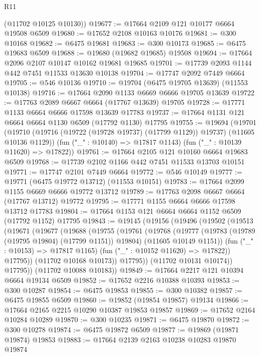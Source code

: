 \begin{lexlean}{R11}
\begin{coremodule}
{{{{{{{{{{{{{{{{{{{{{{{{{{{{{{{{{{{{{{{{{{{{{{{{{{{{{{{{{{{{{{{{{{{{{{{{{{{{{{{{{{      (@11702 @10125 @10130))
@19677 := @17664 @2109 @121 @10177 @6664 @19508 @6509
@19680 := @17652 @2108 @10163 @10176
@19681 := @300 @10168
@19682 := @6475 @19681
@19683 := @300 @10173
@19685 := @6475 @19683 @6509
@19688 := @19680 (@19682 @19685) @19508
@19694 := @17664 @2096 @2107 @10147 @10162 @19681 @19685
@19701 := @17739 @2093 @1144 @442 @7451 @11533 @13630 @10138
@19704 := @17747 @2092 @7449 @6664
@19705 := @546 @10136
@19710 := @19704 (@6475 @19705 @13639) (@11553 @10138)
@19716 := @17664 @2090 @1133 @6669 @6666 @19705 @13639
@19722 := @17763 @2089 @6667 @6664 (@17767 @13639) @19705
@19728 := @17771 @1133 @6664 @6666 @17598 @13639 @17783
@19737 := @17664 @1131 @121 @6664 @6664 @1130 @6509 (@17792 @1130) @17795
@19755 := @19694
    (@19701
      (@19710 (@19716 (@19722 (@19728 @19737) (@17799 @1129)) @19737) (@11605 @10136 @1129))
      (fun ("_" : @10140) => @17817 @1143)
      (fun ("_" : @10139 @11620) => @17822))
@19761 := @17664 @2105 @121 @10160 @6664 @19683 @6509
@19768 := @17739 @2102 @1166 @442 @7451 @11533 @13703 @10151
@19771 := @17747 @2101 @7449 @6664
@19772 := @546 @10149
@19777 := @19771 (@6475 @19772 @13712) (@11553 @10151)
@19783 := @17664 @2099 @1155 @6669 @6666 @19772 @13712
@19789 := @17763 @2098 @6667 @6664 (@17767 @13712) @19772
@19795 := @17771 @1155 @6664 @6666 @17598 @13712 @17783
@19804 := @17664 @1153 @121 @6664 @6664 @1152 @6509 (@17792 @1152) @17795
@19843 := @19145
    (@19156
      (@19496
        (@19502
          (@19513
            (@19671
              (@19677
                (@19688
                  (@19755
                    (@19761
                      (@19768
                        (@19777
                          (@19783 (@19789 (@19795 @19804) (@17799 @1151)) @19804)
                          (@11605 @10149 @1151))
                        (fun ("_" : @10153) => @17817 @1165)
                        (fun ("_" : @10152 @11620) => @17822))
                      @17795))
                  (@11702 @10168 @10173))
                @17795))
            (@11702 @10131 @10174))
          @17795))
      (@11702 @10088 @10183))
@19849 := @17664 @2217 @121 @10394 @6664 @19134 @6509
@19852 := @17652 @2216 @10388 @10393
@19853 := @300 @10287
@19854 := @6475 @19853
@19855 := @300 @10382
@19857 := @6475 @19855 @6509
@19860 := @19852 (@19854 @19857) @19134
@19866 := @17664 @2165 @2215 @10290 @10387 @19853 @19857
@19869 := @17652 @2164 @10284 @10289
@19870 := @300 @10235
@19871 := @6475 @19870
@19872 := @300 @10278
@19874 := @6475 @19872 @6509
@19877 := @19869 (@19871 @19874) @19853
@19883 := @17664 @2139 @2163 @10238 @10283 @19870 @19874
}}}}}}}}}}}}}}}}}}}}}}}}}}}}}}}}}}}}}}}}}}}}}}}}}}}}}}}}}}}}}}}}}}}}}}}}}}}}}}}}}}
\end{coremodule}
\end{lexlean}
